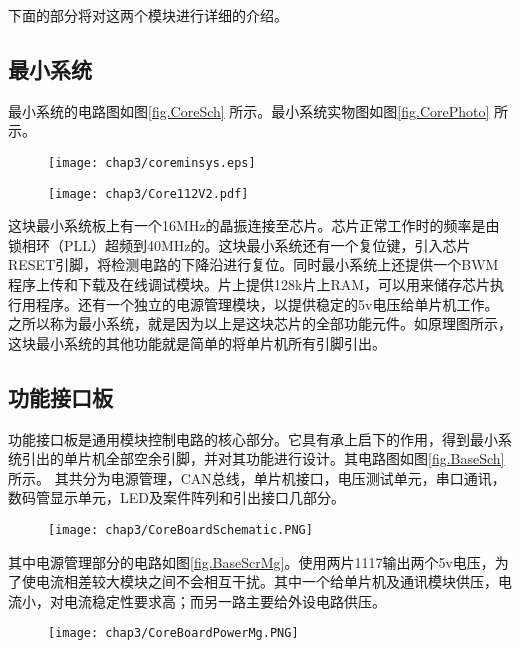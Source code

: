 下面的部分将对这两个模块进行详细的介绍。

\subsection{最小系统}
最小系统的电路图如图\ref{fig.CoreSch} 所示。最小系统实物图如图\ref{fig.CorePhoto} 所示。 \\
\begin{figure}[!htp]
  \centering
  \texttt{[image: chap3/coreminsys.eps]}
\end{figure}
\begin{figure}[!htp]
  \centering
  \texttt{[image: chap3/Core112V2.pdf]}
\end{figure}

这块最小系统板上有一个16MHz的晶振连接至芯片。芯片正常工作时的频率是由锁相环（PLL）超频到40MHz的。这块最小系统还有一个复位键，引入芯片RESET引脚，将检测电路的下降沿进行复位。同时最小系统上还提供一个BWM程序上传和下载及在线调试模块。片上提供128k片上RAM，可以用来储存芯片执行用程序。还有一个独立的电源管理模块，以提供稳定的5v电压给单片机工作。之所以称为最小系统，就是因为以上是这块芯片的全部功能元件。如原理图所示，这块最小系统的其他功能就是简单的将单片机所有引脚引出。 

\subsection{功能接口板}
功能接口板是通用模块控制电路的核心部分。它具有承上启下的作用，得到最小系统引出的单片机全部空余引脚，并对其功能进行设计。其电路图如图\ref{fig.BaseSch} 所示。 其共分为电源管理，CAN总线，单片机接口，电压测试单元，串口通讯，数码管显示单元，LED及案件阵列和引出接口几部分。 
\begin{figure}[!htp]
  \centering
  \texttt{[image: chap3/CoreBoardSchematic.PNG]}
\end{figure}


其中电源管理部分的电路如图\ref{fig.BaseScrMg}。使用两片1117输出两个5v电压，为了使电流相差较大模块之间不会相互干扰。其中一个给单片机及通讯模块供压，电流小，对电流稳定性要求高；而另一路主要给外设电路供压。 
\begin{figure}[!htp]
  \centering
  \texttt{[image: chap3/CoreBoardPowerMg.PNG]}
\end{figure}



